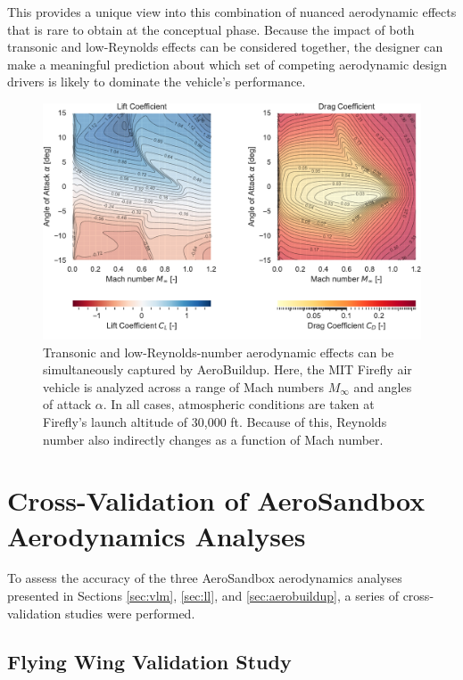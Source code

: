 \noindent This provides a unique view into this combination of nuanced aerodynamic effects that is rare to obtain at the conceptual phase. Because the impact of both transonic and low-Reynolds effects can be considered together, the designer can make a meaningful prediction about which set of competing aerodynamic design drivers is likely to dominate the vehicle's performance.

\begin{figure}[H]
    \centering
    \includegraphics[width=\textwidth]{../figures/aerobuildup_figs/transonic.pdf}
    \caption{Transonic and low-Reynolds-number aerodynamic effects can be simultaneously captured by AeroBuildup. Here, the MIT Firefly air vehicle is analyzed across a range of Mach numbers $M_\infty$ and angles of attack $\alpha$. In all cases, atmospheric conditions are taken at Firefly's launch altitude of 30,000 ft. Because of this, Reynolds number also indirectly changes as a function of Mach number.}
    \label{fig:ab_transonic}
\end{figure}




\section{Cross-Validation of AeroSandbox Aerodynamics Analyses}
\label{sec:aero_validation}

To assess the accuracy of the three AeroSandbox aerodynamics analyses presented in Sections \ref{sec:vlm}, \ref{sec:ll}, and \ref{sec:aerobuildup}, a series of cross-validation studies were performed.

\subsection{Flying Wing Validation Study}

